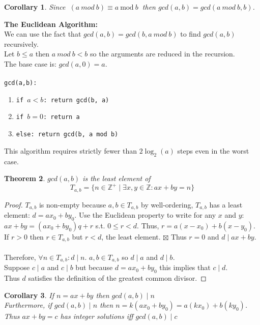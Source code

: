 \documentclass[12pt]{extarticle}
\newcommand{\cont}{$\boxtimes$}
\newcommand{\divides}{\mid}
\newcommand{\Z}{\mathbb{Z}}
\newcommand{\Zplus}{\mathbb{Z}^{+}}
\newtheorem{theorem}{Theorem}[section]
\newtheorem{corollary}[theorem]{Corollary}
\renewcommand{\mod}[3]{\: #1 \equiv #2 \: \mathrm{mod} \: #3 \:}
\begin{document}
\begin{corollary}
Since $\mod{(a \: mod \:b)}{a}{b}$ then $gcd(a,b) = gcd(a \: mod \: b, b)$.
\end{corollary}

\noindent \textbf{The Euclidean Algorithm:}
\\
We can use the fact that $gcd(a,b) = gcd(b, a \: mod \: b)$ to find $gcd(a,b)$ recursively.\\ Let $b \le a$ then $a \: mod \: b < b$ so the arguments are reduced in the recursion.\\
The base case is: $gcd(a,0) = a$.\\\\
{\tt gcd(a,b):}
\begin{enumerate}
\item {\tt if $a < b$: return gcd(b, a)}
\item {\tt if $b = 0$: return a}
\item {\tt else: return gcd(b, a mod b)}
\end{enumerate}
This algorithm requires strictly fewer than $2\log_2(a)$ steps even in the worst case. 
\newpage

\begin{theorem}
$gcd(a,b)$ is the least element of \[T_{a,b} = \{n \in \Zplus  \mid  \exists x,y \in \Z : ax+by = n \}\]
\end{theorem}

\begin{proof}
$T_{a,b}$ is non-empty because $a,b \in T_{a,b}$  by well-ordering, $T_{a,b}$ has a least element: $d = ax_0 + by_0$. Use the Euclidean property to write for any $x$ and $y$: $ax+by = (ax_0 + by_0)q + r$ s.t. $0 \le r < d$.  Thus, $r = a(x-x_0) + b(x-y_0)$.\\
If $r > 0$ then $r \in T_{a,b}$ but $r < d$, the least element. \cont \: Thus $r = 0$ and $d \divides ax+by$. 
\\\\
Therefore, $\forall n \in T_{a,b} : d \divides n$. $a,b \in T_{a,b}$ so $d \divides a$ and $d \divides b$. \\ Suppose $c \divides a$ and $c \divides b$ but because $d = ax_0 + by_0$ this implies that $c \divides d$. \\
Thus $d$ satisfies the definition of the greatest common divisor.
\end{proof}

\begin{corollary}
\label{gcdintsol}
If $n = ax + by$ then $gcd(a,b) \divides n$ \\
Furthermore, if $gcd(a,b) \divides n$ then $n = k(ax_0+by_0) = a(kx_0) + b(ky_0)$. \\
Thus $ax+by = c$ has integer solutions iff $gcd(a,b) \divides  c$
\end{corollary}
\end{document}

